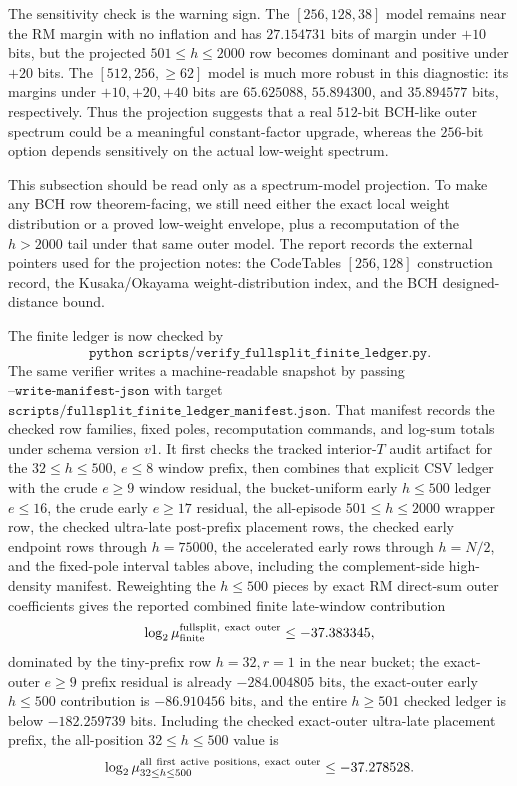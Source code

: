 The sensitivity check is the warning sign.  The \([256,128,38]\) model remains near the RM margin with no inflation and
has \(27.154731\) bits of margin under \(+10\) bits, but the projected \(501\le h\le2000\) row becomes dominant and
positive under \(+20\) bits.  The \([512,256,\ge62]\) model is much more robust in this diagnostic: its margins under
\(+10,+20,+40\) bits are \(65.625088\), \(55.894300\), and \(35.894577\) bits, respectively.  Thus the projection
suggests that a real \(512\)-bit BCH-like outer spectrum could be a meaningful constant-factor upgrade, whereas the
\(256\)-bit option depends sensitively on the actual low-weight spectrum.

This subsection should be read only as a spectrum-model projection.  To make any BCH row theorem-facing, we still need
either the exact local weight distribution or a proved low-weight envelope, plus a recomputation of the \(h>2000\) tail
under that same outer model.  The report records the external pointers used for the projection notes: the CodeTables
\([256,128]\) construction record, the Kusaka/Okayama weight-distribution index, and the BCH designed-distance bound.

The finite ledger is now checked by
\[
\texttt{python scripts/verify\_fullsplit\_finite\_ledger.py}.
\]
The same verifier writes a machine-readable snapshot by passing \(\texttt{--write-manifest-json}\) with target
\(\texttt{scripts/fullsplit\_finite\_ledger\_manifest.json}\).
That manifest records the checked row families, fixed poles, recomputation commands, and log-sum totals under schema
version \(v1\).
It first checks the tracked interior-\(T\) audit artifact for the \(32\le h\le500\), \(e\le8\) window prefix, then combines
that explicit CSV ledger with the crude \(e\ge9\) window residual, the bucket-uniform early \(h\le500\) ledger
\(e\le16\), the crude early \(e\ge17\) residual, the all-episode \(501\le h\le2000\) wrapper row, the checked
ultra-late post-prefix placement rows, the checked early endpoint rows through \(h=75000\), the accelerated early rows
through \(h=N/2\), and the fixed-pole interval tables above, including the complement-side high-density manifest.
Reweighting the \(h\le500\) pieces by exact
RM direct-sum outer coefficients gives the reported combined finite late-window contribution
\[
\log_2\mu_{\rm finite}^{\rm fullsplit,\ exact\ outer}\le -37.383345,
\]
dominated by the tiny-prefix row \(h=32,r=1\) in the near bucket; the exact-outer \(e\ge9\) prefix residual is already
\(-284.004805\) bits, the exact-outer early \(h\le500\) contribution is \(-86.910456\) bits, and the entire \(h\ge501\)
checked ledger is below \(-182.259739\) bits.  Including the checked exact-outer ultra-late placement prefix, the
all-position \(32\le h\le500\) value is
\[
\log_2\mu_{32\le h\le500}^{\rm all\ first\ active\ positions,\ exact\ outer}\le -37.278528.
\]

